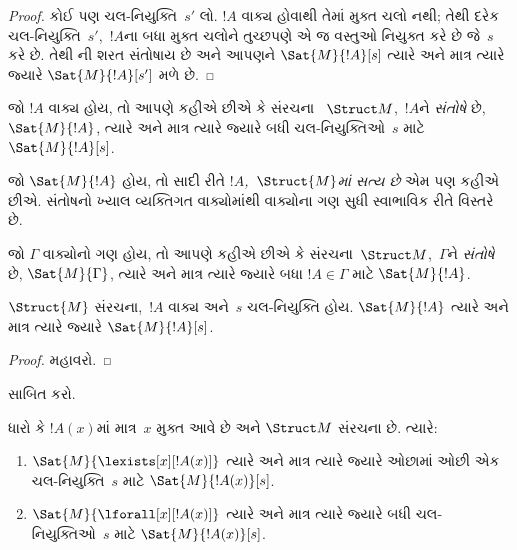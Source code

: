 \begin{proof}
  કોઈ પણ ચલ-નિયુક્તિ~$s'$ લો. $!A$ વાક્ય હોવાથી તેમાં મુક્ત
  ચલો નથી; તેથી દરેક ચલ-નિયુક્તિ~$s'$,~$!A$ના બધા મુક્ત ચલોને
  તુચ્છપણે એ જ વસ્તુઓ નિયુક્ત કરે છે જે~$s$ કરે છે. તેથી
  ની શરત સંતોષાય છે અને આપણને
  $\Sat{M}{!A}[s]$ ત્યારે અને માત્ર ત્યારે જ્યારે
  $\Sat{M}{!A}[s']$ મળે છે.
\end{proof}

\begin{defn}
જો $!A$ વાક્ય હોય, તો આપણે કહીએ છીએ કે સંરચના
~$\Struct M$,~$!A$ને \emph{સંતોષે} છે, $\Sat{M}{!A}$, ત્યારે અને માત્ર
ત્યારે જ્યારે બધી ચલ-નિયુક્તિઓ~$s$ માટે $\Sat{M}{!A}[s]$.
\end{defn}

જો $\Sat{M}{!A}$ હોય, તો સાદી રીતે \emph{$!A$,~$\Struct{M}$માં સત્ય
છે} એમ પણ કહીએ છીએ. સંતોષનો ખ્યાલ વ્યક્તિગત વાક્યોમાંથી
વાક્યોના ગણ સુધી સ્વાભાવિક રીતે વિસ્તરે છે.

\begin{defn}
જો $\Gamma$ વાક્યોનો ગણ હોય, તો આપણે કહીએ છીએ કે
સંરચના~$\Struct M$,~$\Gamma$ને \emph{સંતોષે} છે,
$\Sat{M}{\Gamma}$, ત્યારે અને માત્ર ત્યારે જ્યારે બધા
$!A \in \Gamma$ માટે $\Sat{M}{!A}$.
\end{defn}

\begin{prop}
  $\Struct{M}$ સંરચના,~$!A$ વાક્ય અને~$s$ ચલ-નિયુક્તિ
  હોય. $\Sat{M}{!A}$ ત્યારે અને માત્ર ત્યારે જ્યારે
  $\Sat{M}{!A}[s]$.
\end{prop}

\begin{proof}
મહાવરો.
\end{proof}

\begin{prob}
 સાબિત કરો.
\end{prob}

\begin{prop}
  ધારો કે $!A(x)$માં માત્ર~$x$ મુક્ત આવે છે અને $\Struct M$
  સંરચના છે. ત્યારે:
  \begin{enumerate}
    \item $\Sat{M}{\lexists[x][!A(x)]}$ ત્યારે અને માત્ર
      ત્યારે જ્યારે ઓછામાં ઓછી એક ચલ-નિયુક્તિ~$s$ માટે
      $\Sat{M}{!A(x)}[s]$.
    \item $\Sat{M}{\lforall[x][!A(x)]}$ ત્યારે અને માત્ર
      ત્યારે જ્યારે બધી ચલ-નિયુક્તિઓ~$s$ માટે
      $\Sat{M}{!A(x)}[s]$.
\end{enumerate}
\end{prop}

